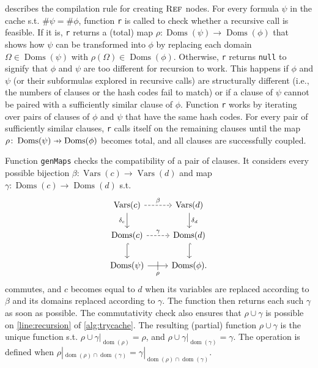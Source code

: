 \documentclass{article}
\theoremstyle{definition}
\theoremstyle{remark}
\newcommand\pfun{\mathrel{\ooalign{\hfil$\mapstochar\mkern5mu$\hfil\cr$\to$\cr}}}
\DeclareMathOperator{\Reff}{\textsc{Ref}}
\DeclareMathOperator{\dom}{dom}
\DeclareMathOperator{\Doms}{Doms}
\DeclareMathOperator{\Vars}{Vars}
\begin{document}
 describes the compilation rule for creating $\Reff$ nodes.
For every formula $\psi$ in the cache s.t. $\#\psi = \#\phi$, function
\texttt{r} is called to check whether a recursive call is feasible. If it is,
\texttt{r} returns a (total) map $\rho\colon \Doms(\psi) \to \Doms(\phi)$ that
shows how $\psi$ can be transformed into $\phi$ by replacing each domain
$\Omega \in \Doms(\psi)$ with $\rho(\Omega) \in \Doms(\phi)$. Otherwise,
\texttt{r} returns \texttt{null} to signify that $\phi$ and $\psi$ are too
different for recursion to work. This happens if $\phi$ and $\psi$ (or their
subformulas explored in recursive calls) are structurally different (i.e., the
numbers of clauses or the hash codes fail to match) or if a clause of $\psi$
cannot be paired with a sufficiently similar clause of $\phi$. Function
\texttt{r} works by iterating over pairs of clauses of $\phi$ and $\psi$ that
have the same hash codes. For every pair of sufficiently similar clauses,
\texttt{r} calls itself on the remaining clauses until the map
$\rho\colon \Doms(\psi) \pfun \Doms(\phi)$ becomes total, and all clauses are
successfully coupled.

Function \texttt{genMaps} checks the compatibility of a pair of clauses. It
considers every possible bijection $\beta\colon \Vars(c) \to \Vars(d)$ and map
$\gamma\colon \Doms(c) \to \Doms(d)$ s.t.
\[
  \begin{tikzcd}
    \Vars(c) \ar[r, dashed, "\beta"] \arrow[d, swap, "\delta_c"] & \Vars(d) \ar[d, "\delta_d"] \\
    \Doms(c) \ar[r, dashed, "\gamma"] \ar[d, hookrightarrow] & \Doms(d) \ar[d, hookrightarrow] \\
    \Doms(\psi) \ar[r, swap, "\rho", "|" marking, outer sep=5pt] & \Doms(\phi).
  \end{tikzcd}
\]
commutes, and $c$ becomes equal to $d$ when its variables are replaced according
to $\beta$ and its domains replaced according to $\gamma$. The function then
returns each such $\gamma$ as soon as possible. The commutativity check also
ensures that $\rho \cup \gamma$ is possible on \cref{line:recursion} of
\cref{alg:trycache}. The resulting (partial) function $\rho \cup \gamma$ is the
unique function s.t. $\rho \cup \gamma|_{\dom(\rho)} = \rho$, and
$\rho \cup \gamma|_{\dom(\gamma)} = \gamma$. The operation is defined when
$\rho|_{\dom(\rho)\cap\dom(\gamma)} = \gamma|_{\dom(\rho)\cap\dom(\gamma)}$.
\end{document}
